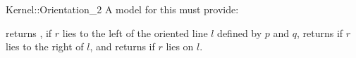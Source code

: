\begin{ccRefFunctionObjectConcept}{Kernel::Orientation_2}
A model for this must provide:


{returns , if $r$ lies to the left of the oriented 
line $l$ defined by $p$ and $q$, returns  if $r$ 
lies to the right of $l$, and returns  if $r$ lies
on $l$.}

\ccSeeAlso
{}\\

\end{ccRefFunctionObjectConcept}
